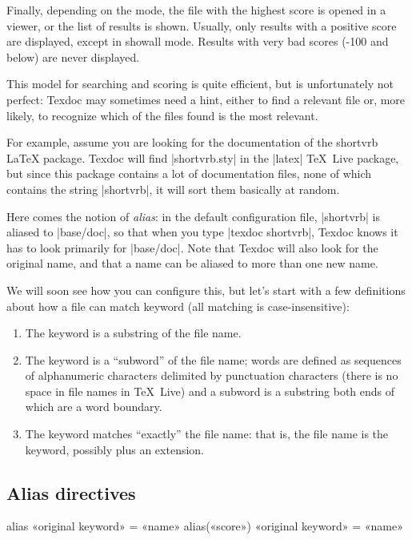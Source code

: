 \documentclass[a4paper,oneside]{scrartcl}
\makeatletter
\newcommand\texlive{\TeX~Live\xspace}
\newenvironment{htcode}
  {\SaveVerbatim[samepage, gobble=2]{verbmat}}
  {
    \endSaveVerbatim
    \par\medskip\noindent\hspace*{\parindent}%
    \BUseVerbatim{verbmat}%
    \par\medskip\@endpetrue
  }
\makeatother
\begin{document}
Finally, depending on the mode, the file with the highest score is opened in a
viewer, or the list of results is shown. Usually, only results with a positive
score are displayed, except in showall mode. Results with very bad scores
(-100 and below) are never displayed.

\medskip

This model for searching and scoring is quite efficient, but is unfortunately
not perfect: Texdoc may sometimes need a hint, either to find a relevant file
or, more likely, to recognize which of the files found is the most relevant.

For example, assume you are looking for the documentation of the shortvrb
{\LaTeX} package. Texdoc will find |shortvrb.sty| in the |latex| \texlive
package, but since this package contains a lot of documentation files, none of
which contains the string |shortvrb|, it will sort them basically at random.

Here comes the notion of \emph{alias}: in the default configuration file,
|shortvrb| is aliased to |base/doc|, so that when you type |texdoc shortvrb|,
Texdoc knows it has to look primarily for |base/doc|. Note that Texdoc will
also look for the original name, and that a name can be aliased to more than
one new name.

\medskip

We will soon see how you can configure this, but let's start with a few
definitions about how a file can match keyword (all matching is
case-insensitive):
\begin{enumerate}
  \item The keyword is a substring of the file name.
  \item The keyword is a ``subword'' of the file name; words are defined as
    sequences of alphanumeric characters delimited by punctuation characters
    (there is no space in file names in \texlive) and a subword is a
    substring both ends of which are a word boundary.
  \item The keyword matches ``exactly'' the file name: that is, the file
    name is the keyword, possibly plus an extension.
\end{enumerate}

\subsection{Alias directives}\label{ss-alias}

\begin{htcode}
  alias «original keyword» = «name»
  alias(«score») «original keyword» = «name»
\end{htcode}
\end{document}
